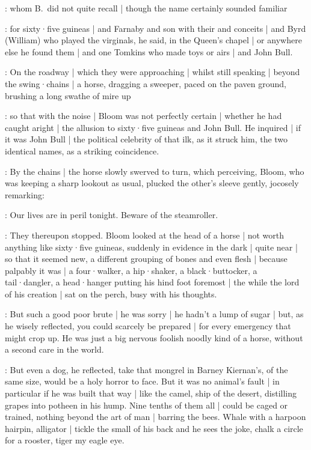 :
whom B.~did not quite recall |
though the name certainly sounded familiar

:
for sixty·five guineas |
and Farnaby and son with their  and  conceits |
and Byrd (William) who played the virginals,
he said,
in the Queen's chapel |
or anywhere else he found them |
and one Tomkins who made toys or airs |
and John Bull.

:
On the roadway |
which they were approaching |
whilst still speaking |
beyond the swing·chains |
a horse,
dragging a sweeper,
paced on the paven ground,
brushing a long swathe of mire up

:
so that with the noise |
Bloom was not perfectly certain |
whether he had caught aright |
the allusion to sixty·five guineas and John Bull.
He inquired |
if it was John Bull |
the political celebrity of that ilk,
as it struck him,
the two identical names,
as a striking coincidence.

:
By the chains |
the horse slowly swerved to turn,
which perceiving,
Bloom,
who was keeping a sharp lookout as usual,
plucked the other's sleeve gently,
jocosely remarking:

\Bloom:
Our lives are in peril tonight.
Beware of the steamroller.

:
They thereupon stopped.
Bloom looked at the head of a horse |
not worth anything like sixty·five guineas,
suddenly in evidence in the dark |
quite near |
so that it seemed new,
a different grouping of bones and even flesh |
because palpably it was |
a four·walker,
a hip·shaker,
a black·buttocker,
a tail·dangler,
a head·hanger putting his hind foot foremost |
the while the lord of his creation |
sat on the perch,
busy with his thoughts.

:
But such a good poor brute |
he was sorry |
he hadn't a lump of sugar |
but,
as he wisely reflected,
you could scarcely be prepared |
for every emergency that might crop up.
He was just a big nervous foolish noodly kind of a horse,
without a second care in the world.%

:
But even a dog,
he reflected,
take that mongrel in Barney Kiernan's,
of the same size,
would be a holy horror to face.
But it was no animal's fault |
in particular if he was built that way |
like the camel,
ship of the desert,
distilling grapes into potheen in his hump.
Nine tenths of them all |
could be caged or trained,
nothing beyond the art of man |
barring the bees.
Whale with a harpoon hairpin,
alligator |
tickle the small of his back and he sees the joke,
chalk a circle for a rooster,
tiger my eagle eye.

